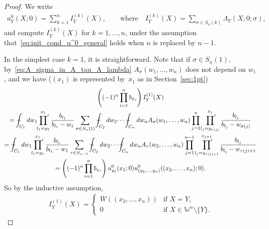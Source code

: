 \documentclass[pdftex]{sigma}
\numberwithin{equation}{section}
\def\Xint#1{\mathchoice
{\XXint\displaystyle\textstyle{#1}}%
{\XXint\textstyle\scriptstyle{#1}}%
{\XXint\scriptstyle\scriptscriptstyle{#1}}%
{\XXint\scriptscriptstyle\scriptscriptstyle{#1}}%
\!\int}
\def\XXint#1#2#3{{\setbox0=\hbox{$#1{#2#3}{\int}$}
\vcenter{\hbox{$#2#3$}}\kern-.5\wd0}}
\def\dashint{\Xint-}
\newcommand{\prodprime}{\sideset{}{'}\prod}
\newcommand{\Weylchamber}{\mathbb{W}}
\begin{document}
\begin{proof}
 We write
 \begin{gather*}
 u^0_Y(X; 0) = \sum^n_{k = 1} I^{(k)}_Y(X), \qquad \text{where} \quad I^{(k)}_Y(X) = \sum_{\sigma \in S_n(k)} \Lambda_Y(X; 0; \sigma),
 \end{gather*}
 and compute $I^{(k)}_Y(X)$ for $k = 1, \dotsc, n$, under the assumption that~\eqref{eq:init_cond_u^0_general} holds when $n$ is replaced by $n - 1$.

 In the simplest case $k = 1$, it is straightforward. Note that if $\sigma \in S_n(1)$, by~\eqref{eq:A_sigma_in_A_tau_A_lambda} $A_{\sigma}(w_1, \dotsc, w_n)$ does not depend on $w_1$, and we have ($(x_1)$ is represented by~$x_1$ as in Section~\ref{sec:1pt})
 \begin{gather*}
  \left( (-1)^n \prod^n_{i = 1} b_{x_i} \right) I^{(1)}_Y(X) \\
 =   \dashint_{C_1} dw_1 \prodprime^{x_1}_{l_1 = y_1} \frac{b_{l_1}}{b_{l_1} - w_1} \sum_{\sigma \in S_n(1)} \dashint_{C_2} dw_2 \dotsi \dashint_{C_n} dw_n A_{\sigma}(w_1, \dotsc, w_n) \prod^n_{j = 2} \prodprime^{x_j}_{l_j = y_{\sigma(j)}} \frac{b_{l_j}}{b_{l_j} - w_{\sigma(j)}} \\
 =   \dashint_{C_1} dw_1 \prodprime^{x_1}_{l_1 = y_1} \frac{b_{l_1}}{b_{l_1} - w_1} \sum_{\tau \in S_{n - 1}} \dashint_{C_2} dw_2 \dotsi \dashint_{C_n} dw_n A_{\tau}(w_2, \dotsc, w_n) \prod^{n - 1}_{j = 1} \prodprime^{x_{j + 1}}_{l_j = y_{\tau(j) + 1}} \frac{b_{l_j}}{b_{l_j} - w_{\tau(j) + 1}} \\
 =  \left( (-1)^n \prod^n_{i = 1} b_{x_i} \right) u^0_{y_1}(x_1; 0) u^0_{(y_2, \dotsc, y_n)}((x_2, \dotsc, x_n); 0).
 \end{gather*}
 So by the inductive assumption,
 \begin{gather*}
 I^{(1)}_Y(X) =
 \begin{cases}
 W((x_2, \dotsc, x_n)) & \text{if $X = Y$}, \\
 0 & \text{if $X \in \Weylchamber^n {\setminus} \{ Y \}$}.
 \end{cases}
 \end{gather*}


\end{proof}
\end{document}
